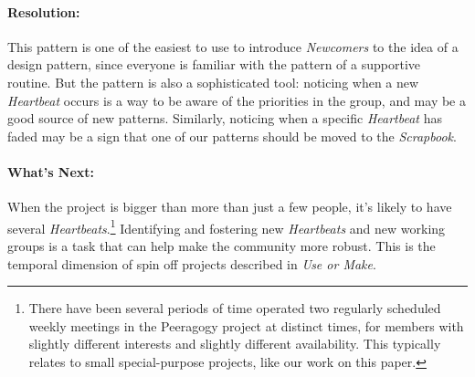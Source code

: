 \paragraph{Resolution:} This pattern is one of the easiest to use to introduce \emph{Newcomers} to the idea of a design pattern, since everyone is familiar with the pattern of a supportive routine.  But the pattern is also a sophisticated tool: noticing when a new \emph{Heartbeat} occurs is a way to be aware of the priorities in the group, and may be a good source of new patterns.  Similarly, noticing when a specific \emph{Heartbeat} has faded may be a sign that one of our patterns should be moved to the \emph{Scrapbook}.

\paragraph{What's Next:} When the project is bigger than more than just a few people, it's likely to have several \emph{Heartbeats}.\footnote{There have been several periods of time operated two regularly scheduled weekly meetings in the Peeragogy project at distinct times, for members with slightly different interests and slightly different availability.  This typically relates to small special-purpose projects, like our work on this paper.}  Identifying and fostering new \emph{Heartbeats} and new working groups is a task that can help make the community more robust.  This is the temporal dimension of spin off projects described in \emph{Use or Make}.
